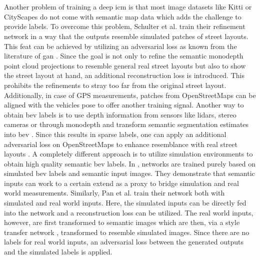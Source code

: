 \\\\ 
Another problem of training a deep \gls{icm} is that most image datasets like Kitti \cite{geiger2013vision} or CityScapes \cite{cordts2016cityscapes} do not come with semantic map data which adds the challenge to provide labels. To overcome this problem, Schulter et al. \cite{schulter2018learning} train their refinement network in a way that the outputs resemble simulated patches of street layouts. This feat can be achieved by utilizing an adversarial loss as known from the literature of \gls{gan} \cite{goodfellow2020generative}. Since the goal is not only to refine the semantic monodepth point cloud projections to resemble general real street layouts but also to show the street layout at hand, an additional reconstruction loss is introduced. This prohibits the refinements to stray too far from the original street layout. Additionally, in case of GPS measurements, patches from OpenStreetMaps \cite{haklay2008openstreetmap} can be aligned with the vehicles pose to offer another training signal. Another way to obtain \gls{bev} labels is to use depth information from sensors like lidars, stereo cameras or through monodepth and transform semantic segmentation estimates into \gls{bev} \cite{mani2020monolayout,lu2019monocular}. Since this results in sparse labels, one can apply an additional adversarial loss on OpenStreetMaps to enhance resemblance with real street layouts \cite{mani2020monolayout}. A completely different approach is to utilize simulation environments to obtain high quality semantic \gls{bev} labels. In \cite{reiher2020sim2real}, networks are trained purely based on simulated \gls{bev} labels and semantic input images. They demonstrate that semantic inputs can work to a certain extend as a proxy to bridge simulation and real world measurements. Similarly, Pan et al. \cite{pan2020cross} train their network both with simulated and real world inputs. Here, the simulated inputs can be directly fed into the network and a reconstruction loss can be utilized. The real world inputs, however, are first transformed to semantic images which are then, via a style transfer network \cite{jing2019neural}, transformed to resemble simulated images. Since there are no labels for real world inputs, an adversarial loss between the generated outputs and the simulated labels is applied.
\\\\
